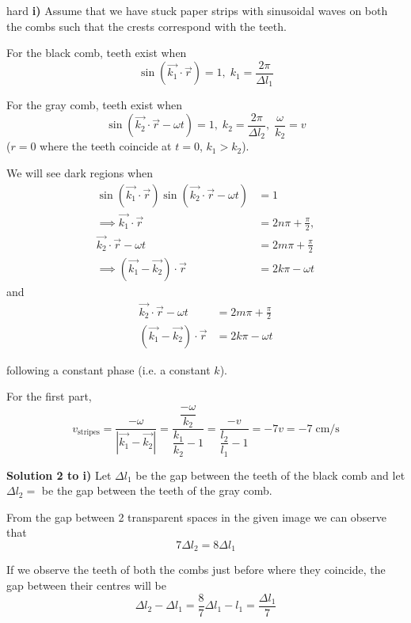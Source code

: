 \begin{solution}{hard}
\textbf{i)} Assume that we have stuck paper strips with sinusoidal waves on both the combs such that the crests correspond with the teeth.\vspace{3mm}

For the black comb, teeth exist when
$$\sin \left(\vec{k_1}\cdot\vec{r}\right)=1, \;k_1=\frac{2 \pi}{\Delta l_1}$$

For the gray comb, teeth exist when
$$\sin\left(\vec{k_2}\cdot\vec{r}-\omega t\right)=1, \;k_2=\frac{2 \pi}{\Delta l_2}, \;\frac{\omega}{k_2}=v$$ 
($r=0$ where the teeth coincide at $t=0$, $k_1 > k_2$).\vspace{3mm}

We will see dark regions when 
\begin{align*}
\sin \left(\vec{k_1}\cdot\vec{r}\right)\sin\left(\vec{k_2}\cdot\vec{r}-\omega t\right)&=1\\
\implies\vec{k_1}\cdot\vec{r}&=2n\pi +\frac{\pi}{2},\\
\vec{k_2}\cdot\vec{r}-\omega t &= 2m\pi+\frac{\pi}{2}\\
\implies \left(\vec{k_1}-\vec{k_2}\right)\cdot\vec{r}&=2k\pi -\omega t
\end{align*}
and 
\begin{align*}
\vec{k_2}\cdot\vec{r}-\omega t &= 2m\pi+\frac{\pi}{2}\\
(\vec{k_1}-\vec{k_2})\cdot\vec{r}&=2k\pi -\omega t
\end{align*}

following a constant phase (i.e. a constant $k$).\vspace{3mm}

For the first part,
$$v_{\text{stripes}}=\dfrac{-\omega}{\left | \vec{k_1}-\vec{k_2} \right |}=\dfrac{\dfrac{-\omega }{k_2}}{\dfrac{k_1}{k_2}-1}=\dfrac{-v}{\dfrac{l_2}{l_1}-1}=-7v=\boxed{-7\;\text{cm/s}}$$
\tcbline

\textbf{Solution 2 to i)} Let $\Delta l_1$ be the gap between the teeth of the black comb and let $\Delta l_2=$ be the gap between the teeth of the gray comb.\vspace{3mm}

From the gap between 2 transparent spaces in the given image we can observe that
$$7\Delta l_2 = 8 \Delta l_1$$

If we observe the teeth of both the combs just before where they coincide, the gap between their centres will be
$$\Delta l_2 - \Delta l_1 = \frac{8}{7}\Delta l_1 - l_1 = \frac{\Delta l_1}{7}$$


\end{solution}

